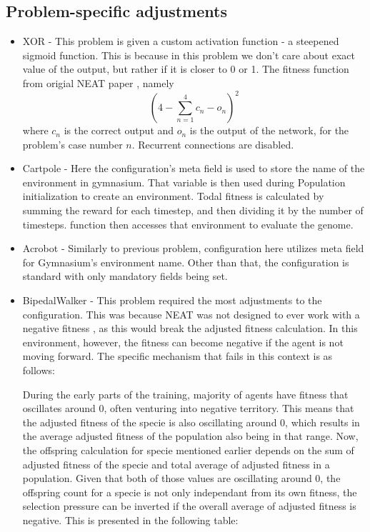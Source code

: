 \documentclass{article}
\begin{document}
        \subsection{Problem-specific adjustments}
        \begin{itemize}
            \item XOR - This problem is given a custom activation function - a steepened sigmoid function.
            This is because in this problem we don't care about exact value of the output, but rather if it is closer to 0 or 1.
            The fitness function from origial NEAT paper \cite{originalNeat}, namely $$(4 - \sum_{n=1}^{4}c_n-o_n)^2$$
            where $c_n$ is the correct output and $o_n$ is the output of the network, for the problem's case number $n$.
            Recurrent connections are disabled.
            \item Cartpole - Here the configuration's meta field is used to store the name of the environment in gymnasium. That 
            variable is then used during Population initialization to create an environment.
            Todal fitness is calculated by summing the reward for each timestep, and then dividing it by the number of timesteps.
             function then accesses that 
            environment to evaluate the genome.  
            \item Acrobot - Similarly to previous problem, configuration here utilizes meta field for Gymnasium's environment name. 
            Other than that, the configuration is standard with only mandatory fields being set.
            \item BipedalWalker - This problem required the most adjustments to the configuration.
            This was because NEAT was not designed to ever work with a negative fitness \cite{ucfNeuroEvolutionAugmenting}, as this would break the adjusted fitness calculation.
            In this environment, however, the fitness can become negative if the agent is not moving forward.
            The specific mechanism that fails in this context is as follows:

            During the early parts of the training, majority of agents have fitness that oscillates around 0, often venturing into negative territory.
            This means that the adjusted fitness of the specie is also oscillating around 0, which results in the average adjusted fitness of the population 
            also being in that range. Now, the offspring calculation for specie mentioned earlier depends on the sum of adjusted fitness of the specie and
            total average of adjusted fitness in a population. Given that both of those values are oscillating around 0, the offspring count for a specie
            is not only independant from its own fitness, the selection pressure can be inverted if the overall average of adjusted fitness is negative.
            This is presented in the following table:


\end{itemize}
\end{document}
